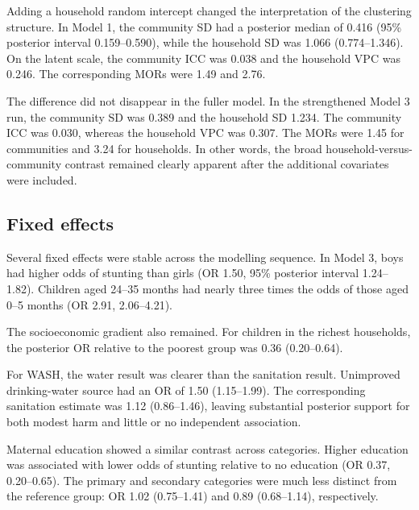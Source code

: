\documentclass[11pt]{article}
\begin{document}
Adding a household random intercept changed the interpretation of the clustering structure. In Model 1, the community SD had a posterior median of 0.416 (95\% posterior interval 0.159--0.590), while the household SD was 1.066 (0.774--1.346). On the latent scale, the community ICC was 0.038 and the household VPC was 0.246. The corresponding MORs were 1.49 and 2.76.

The difference did not disappear in the fuller model. In the strengthened Model 3 run, the community SD was 0.389 and the household SD 1.234. The community ICC was 0.030, whereas the household VPC was 0.307. The MORs were 1.45 for communities and 3.24 for households. In other words, the broad household-versus-community contrast remained clearly apparent after the additional covariates were included.

\subsection{Fixed effects}

Several fixed effects were stable across the modelling sequence. In Model 3, boys had higher odds of stunting than girls (OR 1.50, 95\% posterior interval 1.24--1.82). Children aged 24--35 months had nearly three times the odds of those aged 0--5 months (OR 2.91, 2.06--4.21).

The socioeconomic gradient also remained. For children in the richest households, the posterior OR relative to the poorest group was 0.36 (0.20--0.64).

For WASH, the water result was clearer than the sanitation result. Unimproved drinking-water source had an OR of 1.50 (1.15--1.99). The corresponding sanitation estimate was 1.12 (0.86--1.46), leaving substantial posterior support for both modest harm and little or no independent association.

Maternal education showed a similar contrast across categories. Higher education was associated with lower odds of stunting relative to no education (OR 0.37, 0.20--0.65). The primary and secondary categories were much less distinct from the reference group: OR 1.02 (0.75--1.41) and 0.89 (0.68--1.14), respectively.
\end{document}
